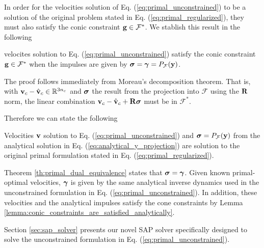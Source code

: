 In order for the velocities solution of Eq. (\ref{eq:primal_unconstrained}) to
be a solution of the original problem stated in Eq.
(\ref{eq:primal_regularized}), they must also satisfy the conic constraint
${\mathbf{g}}\in\mathcal{F}^*$. We stablish this result in the following
\begin{lemma}
    velocites solution to Eq. (\ref{eq:primal_unconstrained}) satisfy the conic
    constraint ${\mathbf{g}}\in\mathcal{F}^*$ when the impulses are given by
    ${\bm\sigma}={\bm\gamma}=P_\mathcal{F}({\mathbf{y}})$.
    \label{lemma:conic_constraints_are_satisfied_analytically}
\end{lemma}
\begin{IEEEproof}
    The proof follows immediately from Moreau's decomposition theorem. That is,
    with ${\mathbf{v}}_c - \hat{{\mathbf{v}}}_c\in\mathbb{R}^{3n_c}$ and ${\bm\sigma}$ the result
    from the projection into $\mathcal{F}$ using the ${\mathbf{R}}$ norm, the linear
    combination ${\mathbf{v}}_c - \hat{{\mathbf{v}}}_c + {\mathbf{R}}{\bm\sigma}$ must be in
    $\mathcal{F}^*$.
\end{IEEEproof}

Therefore we can state the following
\begin{theorem}
    Velocities ${\mathbf{v}}$ solution to Eq. (\ref{eq:primal_unconstrained}) and
    ${\bm\sigma}=P_\mathcal{F}({\mathbf{y}})$ from the analytical solution in Eq.
    (\ref{eq:analytical_y_projection}) are solution to the original primal
    formulation stated in Eq. (\ref{eq:primal_regularized}).
\end{theorem}
\begin{IEEEproof}
    Theorem \ref{th:primal_dual_equivalence} states that ${\bm\sigma}={\bm\gamma}$.
    Given known primal-optimal velocities, ${\bm\gamma}$ is given by the same
    analytical inverse dynamics used in the unconstrained formulation in Eq.
    (\ref{eq:primal_unconstrained}).
    In addition, these velocities and the analytical impulses satisfy the cone
    constraints by Lemma \ref{lemma:conic_constraints_are_satisfied_analytically}.
\end{IEEEproof}

Section \ref{sec:sap_solver} presents our novel SAP  solver specifically designed to solve the
unconstrained formulation in Eq. (\ref{eq:primal_unconstrained}).


